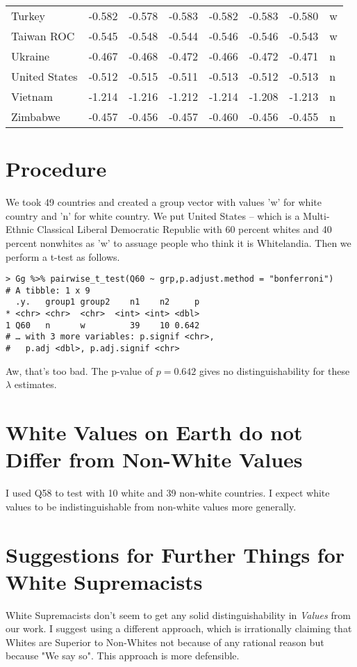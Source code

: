 \documentclass{amsart}
\begin{document}
\begin{longtable}{lrrrrrrl}
  Turkey & -0.582 & -0.578 & -0.583 & -0.582 & -0.583 & -0.580 & w \\ 
  Taiwan ROC & -0.545 & -0.548 & -0.544 & -0.546 & -0.546 & -0.543 & w \\ 
  Ukraine & -0.467 & -0.468 & -0.472 & -0.466 & -0.472 & -0.471 & n \\ 
  United States & -0.512 & -0.515 & -0.511 & -0.513 & -0.512 & -0.513 & n \\ 
  Vietnam & -1.214 & -1.216 & -1.212 & -1.214 & -1.208 & -1.213 & n \\ 
  Zimbabwe & -0.457 & -0.456 & -0.457 & -0.460 & -0.456 & -0.455 & n \\ 
   \hline
\hline
\end{longtable}

\section{Procedure}

We took 49 countries and created a group vector with values 'w' for white country and 'n' for white country.  We put United States -- which is a Multi-Ethnic Classical Liberal Democratic Republic with 60 percent whites and 40 percent nonwhites as 'w' to assuage people who think it is Whitelandia.  Then we perform a t-test as follows.

\begin{verbatim}
> Gg %>% pairwise_t_test(Q60 ~ grp,p.adjust.method = "bonferroni")
# A tibble: 1 x 9
  .y.   group1 group2    n1    n2     p
* <chr> <chr>  <chr>  <int> <int> <dbl>
1 Q60   n      w         39    10 0.642
# … with 3 more variables: p.signif <chr>,
#   p.adj <dbl>, p.adj.signif <chr>

\end{verbatim}

Aw, that's too bad.  The p-value of $p=0.642$ gives no distinguishability for these $\lambda$ estimates. 

\section{White Values on Earth do not Differ from Non-White Values}

I used Q58 to test with 10 white and 39 non-white countries.  I expect white values to be indistinguishable from non-white values more generally.  

\section{Suggestions for Further Things for White Supremacists}

White Supremacists don't seem to get any solid distinguishability in {\em Values} from our work.  I suggest using a different approach, which is irrationally claiming that Whites are Superior to Non-Whites not because of any rational reason but because "We say so".  This approach is more defensible.
\end{document}
